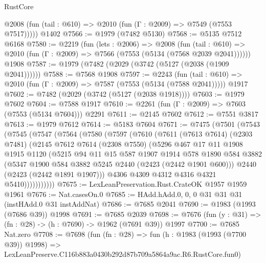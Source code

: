 \begin{lexlean}{RustCore}
\begin{coremodule}
      @2008 (fun (tail : @610) => @2010 (fun (Γ : @2009) => @7549 (@7553 @7517)))))
    @1402
@7566 := @1979 (@7482 @5130)
@7568 := @5135 @7512 @6168
@7580 := @2219
    (fun (lets : @2006) =>
    @2008
      (fun (tail : @610) => @2010 (fun (Γ : @2009) => @7566 (@7553 (@5134 (@7568 @2039 @2041))))))
    @1908
@7587 := @1979 (@7482 (@2029 (@3742 (@5127 (@2038 (@1909 @2041))))))
@7588 := @7568 @1908
@7597 := @2243
    (fun (tail : @610) => @2010 (fun (Γ : @2009) => @7587 (@7553 (@5134 (@7588 @2041)))))
    @1917
@7602 := @7482 (@2029 (@3742 (@5127 (@2038 @1918))))
@7603 := @1979 @7602
@7604 := @7588 @1917
@7610 := @2261 (fun (Γ : @2009) => @7603 (@7553 (@5134 @7604))) @2291
@7611 := @2145 @7602
@7612 := @7551 @3817
@7613 := @1979 @7612
@7614 := @5183 @7604
@7671 := @7475
    (@7501
      (@7543
        (@7545
          (@7547
            (@7564
              (@7580
                (@7597
                  (@7610
                    (@7611
                      (@7613 @7614)
                      (@2303 @7481)
                      (@2145
                        @7612
                        @7614
                        (@2308 @7550)
                        (@5296
                          @467
                          @17
                          @11
                          @1908
                          @1915
                          @1120
                          (@5215
                            @94
                            @11
                            @15
                            @587
                            @1907
                            @1914
                            @578
                            @1890
                            @584
                            @3882
                            (@5347 @1900 @584 @3882 @5245 @2440 (@2423 (@2442 @1901 @600)))
                            @2440
                            (@2423 (@2442 @1891 @1907)))
                          @4306
                          @4309
                          @4312
                          @4316
                          @4321
                          @5410)))))))))))
@7675 := LexLeanPreservation.Rust.CrateOK @1957 @1959 @1961
@7676 := Nat.casesOn.{0}
@7685 := HAdd.hAdd.{0, 0, 0} @31 @31 @31 (instHAdd.{0} @31 instAddNat)
@7686 := @7685 @2041
@7690 := @1983 (@1993 (@7686 @39)) @1998
@7691 := @7685 @2039
@7698 := @7676 (fun (y : @31) => (fn : @28) -> (h : @7690) -> @1962 (@7691 @39)) @1997
@7700 := @7685 Nat.zero
@7708 := @7698
    (fun (fn : @28) =>
    fun (h : @1983 (@1993 (@7700 @39)) @1998) =>
    LexLeanPreserve.C116b883a0430b292d87b709a5864a9ac.R6.RustCore.fun0)

\end{coremodule}
\end{lexlean}
